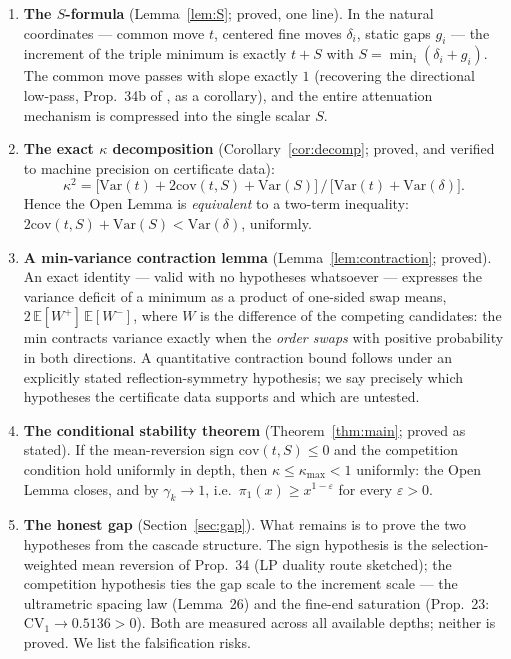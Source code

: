 \documentclass[11pt]{article}
\theoremstyle{definition}
\theoremstyle{remark}
\newcommand{\E}{\mathbb{E}}
\newcommand{\CV}{\mathrm{CV}}
\newcommand{\Var}{\mathrm{Var}}
\newcommand{\cov}{\mathrm{cov}}
\newcommand{\gam}{\gamma}
\newcommand{\kap}{\kappa}
\newcommand{\dl}{\delta}
\begin{document}
\begin{enumerate}
\item \textbf{The $S$-formula} (Lemma~\ref{lem:S}; proved, one line). In
the natural coordinates --- common move $t$, centered fine moves $\dl_i$,
static gaps $g_i$ --- the increment of the triple minimum is exactly
$t + S$ with $S = \min_i(\dl_i + g_i)$. The common move passes with slope
exactly $1$ (recovering the directional low-pass, Prop.~34b of
\cite{NOTE}, as a corollary), and the entire attenuation mechanism is
compressed into the single scalar $S$.
\item \textbf{The exact $\kap$ decomposition}
(Corollary~\ref{cor:decomp}; proved, and verified to machine precision on
certificate data):
\[
\kap^2 = \big[\Var(t) + 2\cov(t,S) + \Var(S)\big] \,/\,
\big[\Var(t) + \Var(\dl)\big].
\]
Hence the Open Lemma is \emph{equivalent} to a two-term inequality:
$2\cov(t,S) + \Var(S) < \Var(\dl)$, uniformly.
\item \textbf{A min-variance contraction lemma}
(Lemma~\ref{lem:contraction}; proved). An exact identity --- valid with
no hypotheses whatsoever --- expresses the variance deficit of a minimum
as a product of one-sided swap means, $2\,\E[W^+]\,\E[W^-]$, where $W$ is the difference of the competing
candidates: the min contracts variance exactly when the \emph{order
swaps} with positive probability in both directions. A quantitative
contraction bound follows under an explicitly stated reflection-symmetry
hypothesis; we say precisely which hypotheses the certificate data
supports and which are untested.
\item \textbf{The conditional stability theorem}
(Theorem~\ref{thm:main}; proved as stated). If the mean-reversion sign
$\cov(t,S) \leq 0$ and the competition condition hold uniformly in depth,
then $\kap \leq \kap_{\max} < 1$ uniformly: the Open Lemma closes, and by
\cite{Gamma26} $\gam_k \to 1$, i.e.\ $\pi_1(x) \geq x^{1-\varepsilon}$
for every $\varepsilon > 0$.
\item \textbf{The honest gap} (Section~\ref{sec:gap}). What remains is to
prove the two hypotheses from the cascade structure. The sign hypothesis
is the selection-weighted mean reversion of Prop.~34 \cite{NOTE} (LP
duality route sketched); the competition hypothesis ties the gap scale to
the increment scale --- the ultrametric spacing law (Lemma~26) and the
fine-end saturation (Prop.~23: $\CV_1 \to 0.5136 > 0$). Both are measured
across all available depths; neither is proved. We list the falsification
risks.
\end{enumerate}
\end{document}
